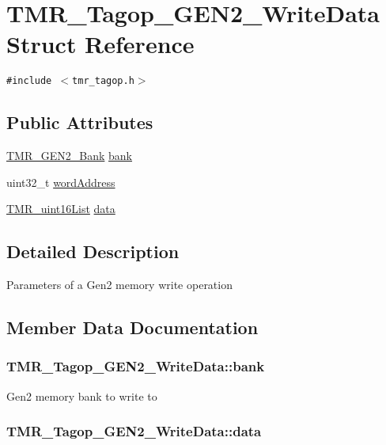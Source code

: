 \hypertarget{struct_t_m_r___tagop___g_e_n2___write_data}{
\section{TMR\_\-Tagop\_\-GEN2\_\-WriteData Struct Reference}
\label{struct_t_m_r___tagop___g_e_n2___write_data}
}
{\tt \#include $<$tmr\_\-tagop.h$>$}

\subsection*{Public Attributes}
\begin{CompactItemize}
\item 
\hyperlink{tmr__gen2_8h_0037d967117e4d1fb33a75ef09a81b03}{TMR\_\-GEN2\_\-Bank} \hyperlink{struct_t_m_r___tagop___g_e_n2___write_data_7a05d938d04804329a5ebdc3d972dc46}{bank}
\item 
uint32\_\-t \hyperlink{struct_t_m_r___tagop___g_e_n2___write_data_ed7370d6ddc9795414fb833287232fc1}{wordAddress}
\item 
\hyperlink{struct_t_m_r__uint16_list}{TMR\_\-uint16List} \hyperlink{struct_t_m_r___tagop___g_e_n2___write_data_9e8e41c317bb4a1f4fc16d781f49f4b6}{data}
\end{CompactItemize}


\subsection{Detailed Description}
Parameters of a Gen2 memory write operation 

\subsection{Member Data Documentation}
\hypertarget{struct_t_m_r___tagop___g_e_n2___write_data_7a05d938d04804329a5ebdc3d972dc46}{
\subsubsection[{bank}]{ {\bf TMR\_\-Tagop\_\-GEN2\_\-WriteData::bank}}}
\label{struct_t_m_r___tagop___g_e_n2___write_data_7a05d938d04804329a5ebdc3d972dc46}


Gen2 memory bank to write to \hypertarget{struct_t_m_r___tagop___g_e_n2___write_data_9e8e41c317bb4a1f4fc16d781f49f4b6}{
\subsubsection[{data}]{ {\bf TMR\_\-Tagop\_\-GEN2\_\-WriteData::data}}}
\label{struct_t_m_r___tagop___g_e_n2___write_data_9e8e41c317bb4a1f4fc16d781f49f4b6}


